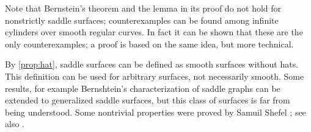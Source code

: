 Note that Bernstein's theorem and the lemma in its proof do not hold for nonstrictly saddle surfaces;
counterexamples can be found among infinite cylinders over smooth regular curves.
In fact it can be shown that these are the only counterexamples;
a proof is based on the same idea, but more technical.

By \ref{prop:hat}, saddle surfaces can be defined as smooth surfaces without hats.
This definition can be used for arbitrary surfaces, not necessarily smooth.
Some results, for example Bernshtein's characterization of saddle graphs can be extended to generalized saddle surfaces, but this class of surfaces is far from being understood.
Some nontrivial properties were proved by Samuil Shefel \cite{shefel}; see also \cite[Capter 4]{akp}.
